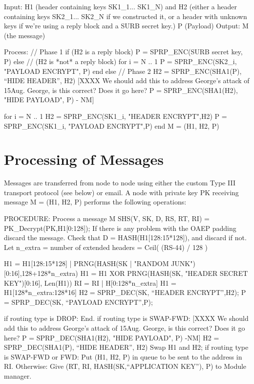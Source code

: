 Input: H1 (header containing keys SK1_1... SK1_N)
       and H2 (either a header containing keys SK2_1... SK2_N if
         we constructed it, or a header with unknown keys if we're
         using a reply block and a SURB secret key.)
       P (Payload)
Output: M (the message)

Process:
        // Phase 1
        if (H2 is a reply block)
                P = SPRP_ENC(SURB secret key, P)
	else // (H2 is *not* a reply block)
		for i = N .. 1
	            P = SPRP_ENC(SK2_i, "PAYLOAD ENCRYPT", P)
		end
        else
	// Phase 2
	H2 = SPRP_ENC(SHA1(P), ``HIDE HEADER'', H2)
[XXXX We should add this to address George's attack of 15Aug.  George,
      is this correct?  Does it go here?
        P = SPRP_ENC(SHA1(H2), "HIDE PAYLOAD", P)
                                                       - NM]

	for i = N .. 1
		H2 = SPRP_ENC(SK1_i, "HEADER ENCRYPT",H2)
		P = SPRP_ENC(SK1_i, "PAYLOAD ENCRYPT",P)
	end
	M = (H1, H2, P)

\section{Processing of Messages}

Messages are transferred from node to node using either the custom Type
III transport protocol (see below) or email.  A node with private key
PK receiving message M = (H1, H2, P) performs the following operations:

PROCEDURE: Process a message M
	SHS(V, SK, D, RS, RT, RI) = PK_Decrypt(PK,H1[0:128]);
        If there is any problem with the OAEP padding discard the message.
        Check that D = HASH(H1[128:15*128]), and discard if not.
        Let n_extra = number of extended headers = Ceil( (RS-44) / 128 )
                  
        H1 = H1[128:15*128] | PRNG(HASH(SK | "RANDOM 
                                               JUNK")[0:16],128+128*n_extra)
	H1 = H1 XOR PRNG(HASH(SK, "HEADER SECRET KEY")[0:16], Len(H1))
        RI = RI | H[0:128*n_extra]
        H1 = H1[128*n_extra:128*16]
	H2 = SPRP_DEC(SK, ``HEADER ENCRYPT'',H2);
	P = SPRP_DEC(SK, ``PAYLOAD ENCRYPT'',P);

	if routing type is DROP:
                End.
	if routing type is SWAP-FWD:
[XXXX We should add this to address George's attack of 15Aug.  George,
      is this correct?  Does it go here?
                P = SPRP_DEC(SHA1(H2), "HIDE PAYLOAD", P)
                                                             -NM]
		H2 = SPRP_DEC(SHA1(P), ``HIDE HEADER'', H2)
		Swap H1 and H2;
        if routing type is SWAP-FWD or FWD:
	   	Put (H1, H2, P) in queue to be sent to the address in RI.
        Otherwise:
		Give (RT, RI, HASH(SK,``APPLICATION KEY''), P) to
Module manager. 

